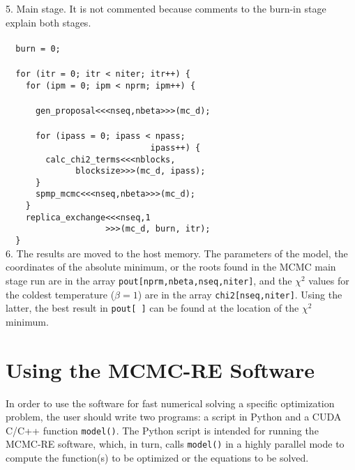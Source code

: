 \documentclass[preprint2]{aastex}
\begin{document}
5. Main stage. It is not commented because comments to the burn-in stage explain both stages. \\ \\
\verb|  burn = 0;| \\\\
\verb|  for (itr = 0; itr < niter; itr++) {| \\
\verb|    for (ipm = 0; ipm < nprm; ipm++) {| \\\\
\verb|      gen_proposal<<<nseq,nbeta>>>(mc_d);| \\\\
\verb|      for (ipass = 0; ipass < npass;| \\
\verb|                             ipass++) {| \\
\verb|        calc_chi2_terms<<<nblocks,| \\
\verb|              blocksize>>>(mc_d, ipass);| \\
\verb|      }| \\
\verb|      spmp_mcmc<<<nseq,nbeta>>>(mc_d);| \\
\verb|    }| \\
\verb|    replica_exchange<<<nseq,1| \\
\verb|                    >>>(mc_d, burn, itr);| \\
\verb|  }| \\

6. The results are moved to the host memory. The parameters of the model, the coordinates of the absolute minimum, or the roots found in the MCMC main stage run are in the array 
\verb|pout[nprm,nbeta,nseq,niter]|, and the $\chi^2$ values for the coldest temperature ($\beta=1$) are in the array \verb|chi2[nseq,niter]|. Using the latter, the best result in \verb|pout[ ]| can be found at the location of the $\chi^2$ minimum.


 
\section{Using the MCMC-RE Software}

In order to use the software for fast numerical solving a specific optimization
problem, the user should write two programs: a script in Python and a CUDA C/C++ 
function \verb|model()|. The Python script is intended for running the MCMC-RE 
software, which, in turn, calls \verb|model()| in a highly parallel mode to 
compute the function(s) to be optimized or the equations to be solved. 
\end{document}
